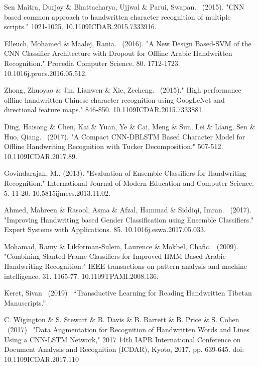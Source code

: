 \documentclass{article}
\begin{document}
\begin{thebibliography}{99}
   Sen Maitra, Durjoy \& Bhattacharya, Ujjwal \& Parui, Swapan. \ (2015). "CNN based common approach to handwritten character recognition of multiple scripts." 1021-1025. 10.1109\/ICDAR.2015.7333916.

   Elleuch, Mohamed \& Maalej, Rania. \ (2016). "A New Design Based-SVM of the CNN Classifier Architecture with Dropout for Offline Arabic Handwritten Recognition." Procedia Computer Science. 80. 1712-1723. 10.1016\/j.procs.2016.05.512.

   Zhong, Zhuoyao \& Jin, Lianwen \& Xie, Zecheng. \ (2015)." High performance offline handwritten Chinese character recognition using GoogLeNet and directional feature maps." 846-850. 10.1109\/ICDAR.2015.7333881.

   Ding, Haisong \& Chen, Kai \& Yuan, Ye \& Cai, Meng \& Sun, Lei \& Liang, Sen \& Huo, Qiang. \ (2017). "A Compact CNN-DBLSTM Based Character Model for Offline Handwriting Recognition with Tucker Decomposition." 507-512. 10.1109\/ICDAR.2017.89.

   Govindarajan, M.. (2013). "Evaluation of Ensemble Classifiers for Handwriting Recognition." International Journal of Modern Education and Computer Science. 5. 11-20. 10.5815\/ijmecs.2013.11.02.

   Ahmed, Mahreen \& Rasool, Asma \& Afzal, Hammad \& Siddiqi, Imran. \ (2017). "Improving Handwriting based Gender Classification using Ensemble Classifiers." Expert Systems with Applications. 85. 10.1016\/j.eswa.2017.05.033.

   Mohamad, Ramy \& Likforman-Sulem, Laurence \& Mokbel, Chafic. \ (2009). "Combining Slanted-Frame Classifiers for Improved HMM-Based Arabic Handwriting Recognition." IEEE transactions on pattern analysis and machine intelligence. 31. 1165-77. 10.1109\/TPAMI.2008.136.

   Keret, Sivan \ (2019) \ “Transductive Learning for Reading Handwritten Tibetan Manuscripts.”

   C. Wigington \& S. Stewart \& B. Davis \& B. Barrett \& B. Price \& S. Cohen \ (2017) \ "Data Augmentation for Recognition of Handwritten Words and Lines Using a CNN-LSTM Network," 2017 14th IAPR International Conference on Document Analysis and Recognition (ICDAR), Kyoto, 2017, pp. 639-645. doi: 10.1109\/ICDAR.2017.110
  

\end{thebibliography}
\end{document}
